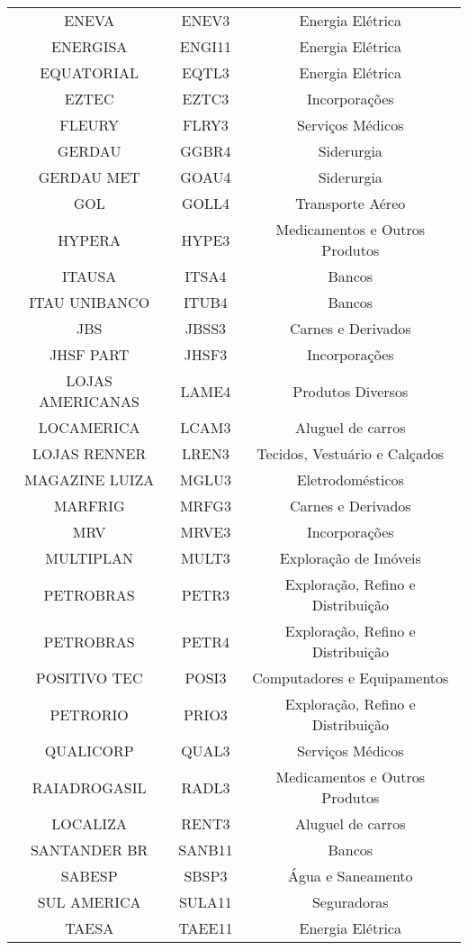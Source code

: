 {\begin{longtable}[c]{ccc}
    ENEVA & ENEV3 & Energia Elétrica \\
    ENERGISA & ENGI11 & Energia Elétrica \\
    EQUATORIAL & EQTL3 & Energia Elétrica \\
    EZTEC & EZTC3 & Incorporações \\
    FLEURY & FLRY3 & Serviços Médicos \\
    GERDAU & GGBR4 & Siderurgia \\
    GERDAU MET & GOAU4 & Siderurgia \\
    GOL & GOLL4 & Transporte Aéreo \\
    HYPERA & HYPE3 & Medicamentos e Outros Produtos \\
    ITAUSA & ITSA4 & Bancos \\
    ITAU UNIBANCO & ITUB4 & Bancos \\
    JBS & JBSS3 & Carnes e Derivados \\
    JHSF PART & JHSF3 & Incorporações \\
    LOJAS AMERICANAS & LAME4 & Produtos Diversos \\
    LOCAMERICA & LCAM3 & Aluguel de carros \\
    LOJAS RENNER & LREN3 & Tecidos, Vestuário e Calçados \\
    MAGAZINE LUIZA & MGLU3 & Eletrodomésticos \\
    MARFRIG & MRFG3 & Carnes e Derivados \\
    MRV & MRVE3 & Incorporações \\
    MULTIPLAN & MULT3 & Exploração de Imóveis \\
    PETROBRAS & PETR3 & Exploração, Refino e Distribuição \\
    PETROBRAS & PETR4 & Exploração, Refino e Distribuição \\
    POSITIVO TEC & POSI3 & Computadores e Equipamentos \\
    PETRORIO & PRIO3 & Exploração, Refino e Distribuição \\
    QUALICORP & QUAL3 & Serviços Médicos \\
    RAIADROGASIL & RADL3 & Medicamentos e Outros Produtos \\
    LOCALIZA & RENT3 & Aluguel de carros \\
    SANTANDER BR & SANB11 & Bancos \\
    SABESP & SBSP3 & Água e Saneamento \\
    SUL AMERICA & SULA11 & Seguradoras \\
    TAESA & TAEE11 & Energia Elétrica \\

\end{longtable}}
